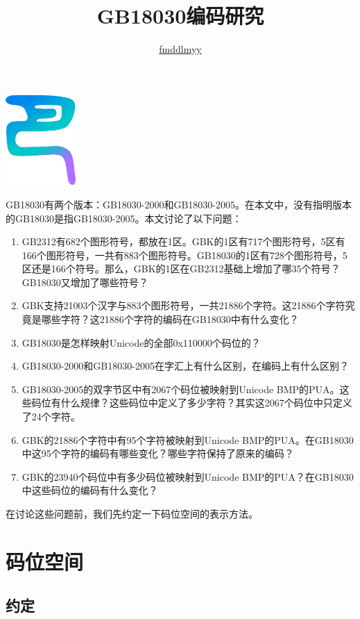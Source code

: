 \documentclass[cn,hazy,blue,14pt,screen]{elegantnote}
\title{GB18030编码研究}
\author{\href{http://www.fmddlmyy.cn/text30.html}{fmddlmyy}}
\institute{GBK、GB18030与Unicode的映射}
\date{\zhtoday}
\begin{document}
\maketitle

\centerline{
	\includegraphics[width=0.2\textwidth]{logo.png}
}


GB18030有两个版本：GB18030-2000和GB18030-2005。在本文中，没有指明版本的GB18030是指GB18030-2005。本文讨论了以下问题：

\begin{enumerate}
\item
  GB2312有682个图形符号，都放在1区。GBK的1区有717个图形符号，5区有166个图形符号，一共有883个图形符号。GB18030的1区有728个图形符号，5区还是166个符号。那么，GBK的1区在GB2312基础上增加了哪35个符号？GB18030又增加了哪些符号？
\item
  GBK支持21003个汉字与883个图形符号，一共21886个字符。这21886个字符究竟是哪些字符？这21886个字符的编码在GB18030中有什么变化？
\item
  GB18030是怎样映射Unicode的全部0x110000个码位的？
\item
  GB18030-2000和GB18030-2005在字汇上有什么区别，在编码上有什么区别？
\item
  GB18030-2005的双字节区中有2067个码位被映射到Unicode
  BMP的PUA。这些码位有什么规律？这些码位中定义了多少字符？其实这2067个码位中只定义了24个字符。
\item
  GBK的21886个字符中有95个字符被映射到Unicode
  BMP的PUA。在GB18030中这95个字符的编码有哪些变化？哪些字符保持了原来的编码？
\item
  GBK的23940个码位中有多少码位被映射到Unicode
  BMP的PUA？在GB18030中这些码位的编码有什么变化？
\end{enumerate}

在讨论这些问题前，我们先约定一下码位空间的表示方法。


\section{码位空间}


\subsection{约定}
\end{document}

